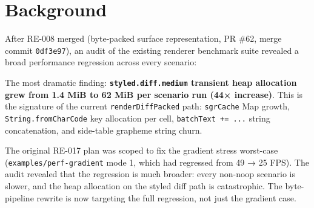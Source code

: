 \section{Background}\label{record-422-background}

After RE-008 merged (byte-packed surface representation, PR \#62, merge commit \texttt{0\allowbreak{}d\allowbreak{}f\allowbreak{}3\allowbreak{}e\allowbreak{}9\allowbreak{}7}), an audit of the existing renderer benchmark suite revealed a broad performance regression across every scenario:



The most dramatic finding: \textbf{\texttt{s\allowbreak{}t\allowbreak{}y\allowbreak{}l\allowbreak{}e\allowbreak{}d\allowbreak{}.\allowbreak{}d\allowbreak{}i\allowbreak{}f\allowbreak{}f\allowbreak{}.\allowbreak{}m\allowbreak{}e\allowbreak{}d\allowbreak{}i\allowbreak{}u\allowbreak{}m} transient heap allocation grew from 1.4 MiB to 62 MiB per scenario run (44× increase)}. This is the signature of the current \texttt{r\allowbreak{}e\allowbreak{}n\allowbreak{}d\allowbreak{}e\allowbreak{}r\allowbreak{}D\allowbreak{}i\allowbreak{}f\allowbreak{}f\allowbreak{}P\allowbreak{}a\allowbreak{}c\allowbreak{}k\allowbreak{}e\allowbreak{}d} path: \texttt{s\allowbreak{}g\allowbreak{}r\allowbreak{}C\allowbreak{}a\allowbreak{}c\allowbreak{}h\allowbreak{}e} Map growth, \texttt{S\allowbreak{}t\allowbreak{}r\allowbreak{}i\allowbreak{}n\allowbreak{}g\allowbreak{}.\allowbreak{}f\allowbreak{}r\allowbreak{}o\allowbreak{}m\allowbreak{}C\allowbreak{}h\allowbreak{}a\allowbreak{}r\allowbreak{}C\allowbreak{}o\allowbreak{}d\allowbreak{}e} key allocation per cell, \texttt{b\allowbreak{}a\allowbreak{}t\allowbreak{}c\allowbreak{}h\allowbreak{}T\allowbreak{}e\allowbreak{}x\allowbreak{}t\allowbreak{} \allowbreak{}+\allowbreak{}=\allowbreak{} \allowbreak{}.\allowbreak{}.\allowbreak{}.} string concatenation, and side-table grapheme string churn.

The original RE-017 plan was scoped to fix the gradient stress worst-case (\texttt{e\allowbreak{}x\allowbreak{}a\allowbreak{}m\allowbreak{}p\allowbreak{}l\allowbreak{}e\allowbreak{}s\allowbreak{}/\allowbreak{}p\allowbreak{}e\allowbreak{}r\allowbreak{}f\allowbreak{}-\allowbreak{}g\allowbreak{}r\allowbreak{}a\allowbreak{}d\allowbreak{}i\allowbreak{}e\allowbreak{}n\allowbreak{}t} mode 1, which had regressed from 49 → 25 FPS). The audit revealed that the regression is much broader: every non-noop scenario is slower, and the heap allocation on the styled diff path is catastrophic. The byte-pipeline rewrite is now targeting the full regression, not just the gradient case.

